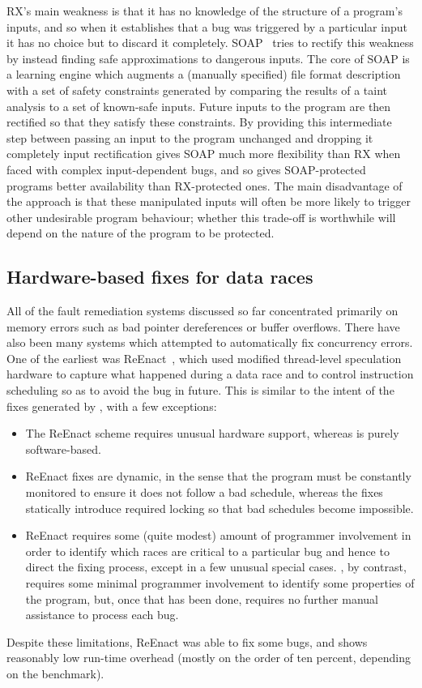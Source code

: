 RX's main weakness is that it has no knowledge of the structure of a
program's inputs, and so when it establishes that a bug was triggered
by a particular input it has no choice but to discard it completely.
SOAP~\cite{Long2012} tries to rectify this weakness by instead finding
safe approximations to dangerous inputs.  The core of SOAP is a
learning engine which augments a (manually specified) file format
description with a set of safety constraints generated by comparing
the results of a taint analysis to a set of known-safe inputs.  Future
inputs to the program are then rectified so that they satisfy these
constraints.  By providing this intermediate step between passing an
input to the program unchanged and dropping it completely input
rectification gives SOAP much more flexibility than RX when faced with
complex input-dependent bugs, and so gives SOAP-protected programs
better availability than RX-protected ones.  The main disadvantage of
the approach is that these manipulated inputs will often be more
likely to trigger other undesirable program behaviour; whether this
trade-off is worthwhile will depend on the nature of the program to be
protected.

\subsection{Hardware-based fixes for data races}
All of the fault remediation systems discussed so far concentrated
primarily on memory errors such as bad pointer dereferences or buffer
overflows.  There have also been many systems which attempted to
automatically fix concurrency errors.  One of the earliest was
ReEnact~\cite{Prvulovic2003a}, which used modified thread-level
speculation hardware to capture what happened during a data race and
to control instruction scheduling so as to avoid the bug in future.
This is similar to the intent of the fixes generated by {\technique},
with a few exceptions:
\begin{itemize}
\item The ReEnact scheme requires unusual hardware support, whereas
  {\technique} is purely software-based.
\item ReEnact fixes are dynamic, in the sense that the program must be
  constantly monitored to ensure it does not follow a bad schedule,
  whereas the {\technique} fixes statically introduce required locking
  so that bad schedules become impossible.
\item ReEnact requires some (quite modest) amount of programmer
  involvement in order to identify which races are critical to a
  particular bug and hence to direct the fixing process, except in a
  few unusual special cases.  {\Technique}, by contrast, requires some
  minimal programmer involvement to identify some properties of the
  program, but, once that has been done, requires no further manual
  assistance to process each bug.
\end{itemize}
Despite these limitations, ReEnact was able to fix some bugs, and
shows reasonably low run-time overhead (mostly on the order of ten
percent, depending on the benchmark).

